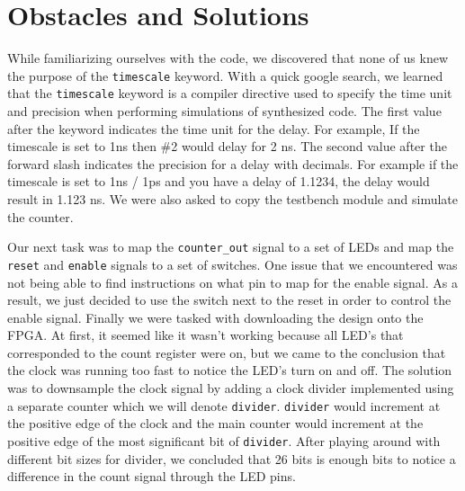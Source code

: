 \documentclass[11pt]{article}
\begin{document}
\section*{Obstacles and Solutions}

While familiarizing ourselves with the code, we discovered that none of us knew the purpose of the  \texttt{timescale} keyword. With a quick google search, we learned that the \texttt{timescale} keyword is a compiler directive used to specify the time unit and precision when performing simulations of synthesized code. The first value after the keyword indicates the time unit for the delay. For example, If the timescale is set to 1ns then \#2 would delay for 2 ns. The second value after the forward slash indicates the precision for a delay with decimals. For example if the timescale is set to 1ns / 1ps and you have a delay of 1.1234, the delay would result in 1.123 ns. We were also asked to copy the testbench module and simulate the counter. 

Our next task was to map the \texttt{counter\_out} signal to a set of LEDs and map the \texttt{reset} and \texttt{enable} signals to a set of switches. One issue that we encountered was not being able to find instructions on what pin to map for the enable signal. As a result, we just decided to use the switch next to the reset in order to control the enable signal. Finally we were tasked with downloading the design onto the FPGA. At first, it seemed like it wasn’t working because all LED’s that corresponded to the count register were on, but we came to the conclusion that the clock was running too fast to notice the LED’s turn on and off. The solution was to downsample the clock signal by adding a clock divider implemented using a separate counter which we will denote \texttt{divider}. \texttt{divider} would increment at the positive edge of the clock and the main counter would increment at the positive edge of the most significant bit of \texttt{divider}. After playing around with different bit sizes for divider, we concluded that 26 bits is enough bits to notice a difference in the count signal through the LED pins.
\end{document}
